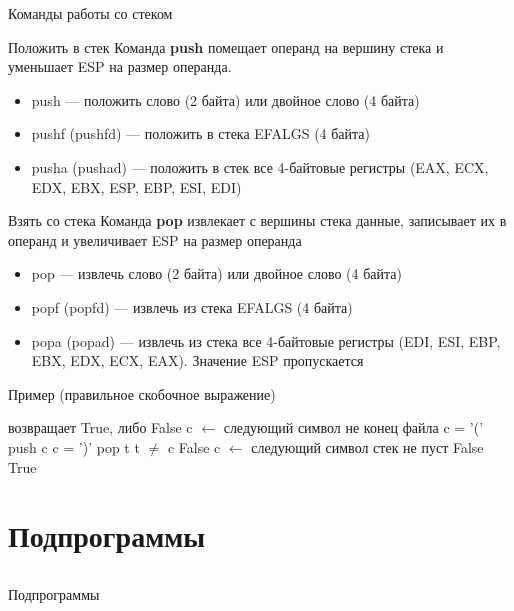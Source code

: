 \documentclass[utf8, russian]{beamer}
\begin{document}
    \begin{frame}{Команды работы со стеком}
        \begin{block}{Положить в стек}\small
            Команда {\bf push} помещает операнд на вершину стека и уменьшает ESP на размер операнда.
            \begin{itemize}
                \item push --- положить слово (2 байта) или двойное слово (4 байта)
                \item pushf (pushfd) --- положить в стека EFALGS (4 байта)
                \item pusha (pushad) --- положить в стек все 4-байтовые регистры (EAX, ECX, EDX, EBX, ESP, EBP, ESI, EDI) 
            \end{itemize}
        \end{block}
        \begin{block}{Взять со стека}\small
            Команда {\bf pop} извлекает с вершины стека данные, записывает их в операнд и увеличивает ESP на размер операнда
            \begin{itemize}
                \item pop --- извлечь слово (2 байта) или двойное слово (4 байта)
                \item popf (popfd) --- извлечь из стека EFALGS (4 байта)
                \item popa (popad) --- извлечь из стека все 4-байтовые регистры (EDI, ESI, EBP, EBX, EDX, ECX, EAX). Значение ESP пропускается             
            \end{itemize}
        \end{block}
    \end{frame}
    \begin{frame}{Пример (правильное скобочное выражение)}
        \begin{codebox}
            \li \Comment возвращает True, либо False
            \li c $\leftarrow$ следующий символ
            \li \While не конец файла
            \li \Do \If c = '(' 
            \li     \Then push c
            \li     \Else \If c = ')'
            \li           \Then pop t
            \li                 \If t $\ne$ c
            \li                 \Then \Return False
                                \End
                          \End
                    \End
            \li     c $\leftarrow$ следующий символ
                \End
            \li \If стек не пуст
            \li \Then \Return False
            \li \Else \Return True
        \end{codebox}
    \end{frame}

    \section{Подпрограммы}
    \subsection{}
    \begin{frame}{Подпрограммы}
    \end{frame}
\end{document}
